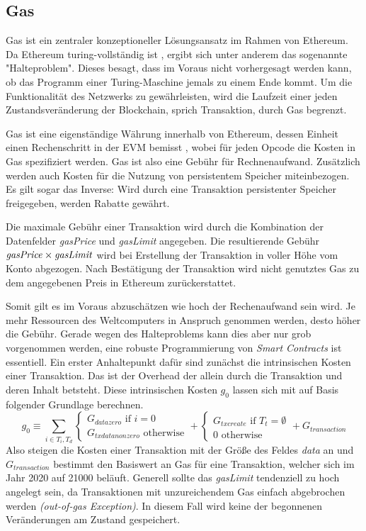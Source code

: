 \documentclass[runningheads]{llncs}
\begin{document}
\subsection{Gas}
\label{gas}
Gas ist ein zentraler konzeptioneller Lösungsansatz im Rahmen von Ethereum. Da Ethereum turing-vollständig ist \cite[S. 1]{wood_ethereum/yellowpaper_2019}, ergibt sich unter anderem das sogenannte "Halteproblem". Dieses besagt, dass im Voraus nicht vorhergesagt werden kann, ob das Programm einer Turing-Maschine jemals zu einem Ende kommt. \cite[S.70]{davis_computability_2013} Um die Funktionalität des Netzwerks zu gewährleisten, wird die Laufzeit einer jeden Zustandsveränderung der Blockchain, sprich Transaktion, durch Gas begrenzt.

Gas ist eine eigenständige Währung innerhalb von Ethereum, dessen Einheit einen Rechenschritt in der EVM bemisst \cite[S. 9:3]{m.spain_oasics-tokeneconomics_2019}, wobei für jeden Opcode die Kosten in Gas spezifiziert werden. \cite[S. 25 ff.]{wood_ethereum/yellowpaper_2019} Gas ist also eine Gebühr für Rechnenaufwand. Zusätzlich werden auch Kosten für die Nutzung von persistentem Speicher miteinbezogen. Es gilt sogar das Inverse: Wird durch eine Transaktion persistenter Speicher freigegeben, werden Rabatte gewährt.

Die maximale Gebühr einer Transaktion wird durch die Kombination der Datenfelder \textit{gasPrice} und \textit{gasLimit} angegeben. Die resultierende Gebühr $ \text{\textit{gasPrice}} \times \text{\textit{gasLimit}} $ wird bei Erstellung der Transaktion in voller Höhe vom Konto abgezogen. Nach Bestätigung der Transaktion wird nicht genutztes Gas zu dem angegebenen Preis in Ethereum zurückerstattet.

Somit gilt es im Voraus abzuschätzen wie hoch der Rechenaufwand sein wird. Je mehr Ressourcen des Weltcomputers in Anspruch genommen werden, desto höher die Gebühr. Gerade wegen des Halteproblems kann dies aber nur grob vorgenommen werden, eine robuste Programmierung von \textit{Smart Contracts} ist essentiell. Ein erster Anhaltepunkt dafür sind zunächst die intrinsischen Kosten einer Transaktion. Das ist der Overhead der allein durch die Transaktion und deren Inhalt betsteht. Diese intrinsischen Kosten $ g_0 $ lassen sich mit auf Basis folgender Grundlage berechnen.
$$ g_0 \equiv \sum_{i \in T_i, T_d}
  \begin{cases}
    G_{datazero} \text{ if } i=0 \\
    G_{txdatanonzero} \text{ otherwise}
  \end{cases}
  +
  \begin{cases}
    G_{txcreate} \text{ if } T_t = \emptyset \\
    0 \text{ otherwise}
  \end{cases}
  +
  G_{transaction}
$$
Also steigen die Kosten einer Transaktion mit der Größe des Feldes \textit{data} an und $ G_{transaction} $ bestimmt den Basiswert an Gas für eine Transaktion, welcher sich im Jahr 2020 auf 21000 beläuft. Generell sollte das \textit{gasLimit} tendenziell zu hoch angelegt sein, da Transaktionen mit unzureichendem Gas einfach abgebrochen werden \textit{(out-of-gas Exception)}. In diesem Fall wird keine der begonnenen Veränderungen am Zustand gespeichert.
\end{document}

